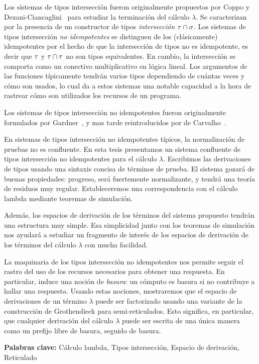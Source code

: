 Los sistemas de tipos intersección fueron originalmente propuestos por
Coppo y Dezani-Ciancaglini~\cite{DBLP:journals/aml/CoppoD78}
para estudiar la terminación del cálculo $\lambda$.
Se caracterizan por la presencia de un constructor de tipos \textit{intersección} $\tau \cap \sigma$.
Los sistemas de tipos intersección \textit{no idempotentes} se distinguen de los (clásicamente) idempotentes
por el hecho de que la intersección de tipos no es idempotente, es decir que $\tau$ y $\tau \cap \tau$
no son tipos equivalentes.
En cambio, la intersección se comporta como un conectivo multiplicativo en lógica lineal.
Los argumentos de las funciones típicamente tendrán varios tipos dependiendo de cuántas veces y cómo son usados,
lo cual da a estos sistemas una notable capacidad a la hora de rastrear cómo son utilizados los recursos
de un programa.

Los sistemas de tipos intersección no idempotentes fueron originalmente formulados por
Gardner~\cite{gardner1994discovering},
y mas tarde reintroducidos por de Carvalho~\cite{carvalho2007semantiques}.

\vspace{1cm}

En sistemas de tipos intersección no idempotentes típicos, la normalización de pruebas no es confluente.
En esta tesis presentamos un sistema confluente de tipos intersección no idempotentes para el cálculo $\lambda$.
Escribimos las derivaciones de tipos usando una sintaxis concisa de términos de prueba.
El sistema gozará de buenas propiedades: progreso, será fuertemente normalizante, y tendrá una teoría de
residuos muy regular.
Estableceremos una correspondencia con el cálculo lambda mediante teoremas de simulación.


Además, los espacios de derivación de los términos del sistema propuesto tendrán una estructura muy simple.
Esa simplicidad junto con los teoremas de simulación nos ayudará a estudiar un fragmento de interés
de los espacios de derivación de los términos del cálculo $\lambda$ con mucha facilidad.

La maquinaria de los tipos intersección no idempotentes nos permite seguir el rastro del uso de los recursos
necesarios para obtener una respuesta.
En particular, induce una noción de \textit{basura}: un cómputo es basura si no contribuye a hallar una respuesta.
Usando estas nociones, mostraremos que el espacio de derivaciones de un término $\lambda$ puede ser factorizado
usando una variante de la construcción de Grothendieck para semi-reticulados.
Esto significa, en particular, que cualquier derivación del cálculo $\lambda$ puede ser escrita
de una única manera como un prefijo libre de basura, seguido de basura.

\vspace{0.5cm}
\noindent
\textbf{Palabras clave:} Cálculo lambda, Tipos intersección, Espacio de derivación, Reticulado
